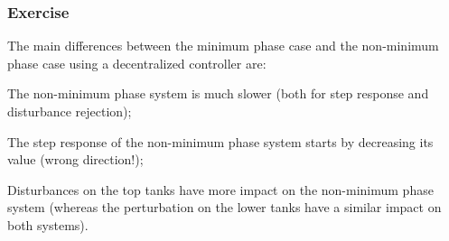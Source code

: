 \subsubsection{Exercise} 

The main differences between the minimum phase case and the non-minimum phase case using a decentralized controller are:
\begin{shortitemize}
    \item The non-minimum phase system is much slower (both for step response and disturbance rejection);
    \item The step response of the non-minimum phase system starts by decreasing its value (wrong direction!);
    \item Disturbances on the top tanks have more impact on the non-minimum phase system (whereas the perturbation on the lower tanks have a similar impact on both systems).
\end{shortitemize}

